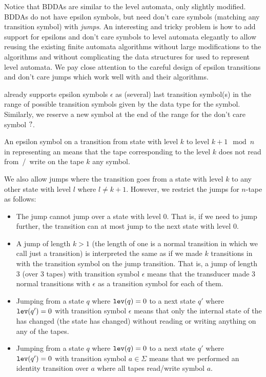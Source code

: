 Notice that BDDAs are similar to the level automata, only slightly modified.
BDDAs do not have epsilon symbols, but need don't care symbols (matching any transition symbol) with \emph{jumps}.
An interesting and tricky problem is how to add support for epsilons and don't care symbols to level automata elegantly to allow reusing the existing finite automata algorithms without large modifications to the algorithms and without complicating the data structures for \nfas used to represent level automata.
We pay close attention to the careful design of epsilon transitions and don't care jumps which work well with \nfas and their algorithms.

\mata already supports epsilon symbols $\epsilon$ as (several) last transition symbol(s) in the range of possible transition symbols given by the data type for the symbol.
Similarly, we reserve a new symbol at the end of the range for the don't care symbol $?$.

An epsilon symbol on a transition from state with level $k$ to level $k + 1 \mod n$ in \nfaClass representing an \nft means that the tape corresponding to the level $k$ does not read from~/~write on the tape $k$ any symbol.

We also allow jumps where the transition goes from a state with level $k$ to any other state with level $l$ where $l \neq k + 1$.
However, we restrict the jumps for $n$-tape \nft as follows:
\begin{itemize}
  \item The jump cannot jump over a state with level $0$.
  That is, if we need to jump further, the transition can at most jump to the next state with level $0$.
  \item A jump of length $k > 1$ (the length of one is a normal transition in \nfaClass which we call just a transition) is interpreted the same as if we made $k$ transitions in \nfaClass with the transition symbol on the jump transition.
  That is, a jump of length $3$ (over $3$ tapes) with transition symbol $\epsilon$ means that the transducer made $3$ normal transitions with $\epsilon$ as a transition symbol for each of them.
  \item Jumping from a state $q$ where $\texttt{lev}(q) = 0$ to a next state $q'$ where $\texttt{lev}(q') = 0$ with transition symbol $\epsilon$ means that only the internal state of the \nft has changed (the state has changed) without reading or writing anything on any of the tapes.
  \item Jumping from a state $q$ where $\texttt{lev}(q) = 0$ to a next state $q'$ where $\texttt{lev}(q') = 0$ with transition symbol $a \in \Sigma$ means that we performed an identity \nft transition over $a$ where all tapes read/write symbol $a$.
\end{itemize}

